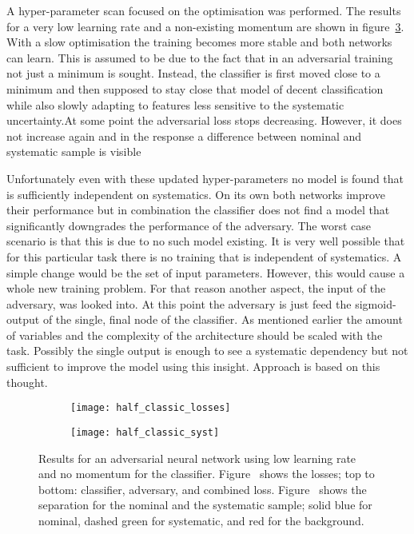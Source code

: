 A hyper-parameter scan focused on the optimisation was performed. The results for a very low learning rate and a non-existing momentum are shown in figure~\ref{fig:app1:half}.
With a slow optimisation the training becomes more stable and both networks can learn. This is assumed to be due to the fact that in an adversarial training not just a minimum is sought. Instead, the classifier is first moved close to a minimum and then supposed to stay close that model of decent classification while also slowly adapting to features less sensitive to the systematic uncertainty.At some point the adversarial loss stops decreasing. However, it does not increase again and in the response a difference between nominal and systematic sample is visible

Unfortunately even with these updated hyper-parameters no model is found that is sufficiently independent on systematics. On its own both networks improve their performance but in combination the classifier does not find a model that significantly downgrades the performance of the adversary.
The worst case scenario is that this is due to no such model existing. It is very well possible that for this particular task there is no training that is independent of systematics.
A simple change would be the set of input parameters. However, this would cause a whole new training problem. For that reason another aspect, the input of the adversary, was looked into. At this point the adversary is just feed the sigmoid-output of the single, final node of the classifier. As mentioned earlier the amount of variables and the complexity of the architecture should be scaled with the task. Possibly the single output is enough to see a systematic dependency but not sufficient to improve the model using this insight. Approach  is based on this thought.

\begin{figure}[htbp]
    \centering
    \begin{subfigure}[b]{0.45\textwidth}
        \texttt{[image: half\_classic\_losses]}
        \caption{}
        \label{fig:app1:half:losses}
    \end{subfigure}
\quad
    \begin{subfigure}[b]{0.45\textwidth}
        \texttt{[image: half\_classic\_syst]}
        \caption{}
        \label{fig:app1:half:syst}
    \end{subfigure}
    \caption{Results for an adversarial neural network using low learning rate and no momentum for the classifier. Figure~ shows the losses; top to bottom: classifier, adversary, and combined loss. Figure~ shows the separation for the nominal and the systematic sample; solid blue for nominal, dashed green for systematic, and red for the background.}
	\label{fig:app1:half}
\end{figure}


